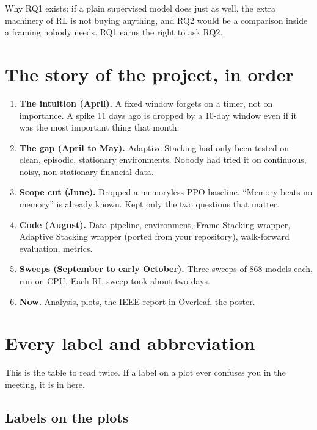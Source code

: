 \documentclass[11pt,a4paper]{article}
\begin{document}
Why RQ1 exists: if a plain supervised model does just as well, the extra machinery of RL is
not buying anything, and RQ2 would be a comparison inside a framing nobody needs. RQ1 earns
the right to ask RQ2.

\section{The story of the project, in order}

\begin{enumerate}
  \item \textbf{The intuition (April).} A fixed window forgets on a timer, not on
        importance. A spike 11 days ago is dropped by a 10-day window even if it was the
        most important thing that month.
  \item \textbf{The gap (April to May).} Adaptive Stacking had only been tested on clean,
        episodic, stationary environments. Nobody had tried it on continuous, noisy,
        non-stationary financial data.
  \item \textbf{Scope cut (June).} Dropped a memoryless PPO baseline. ``Memory beats no
        memory'' is already known. Kept only the two questions that matter.
  \item \textbf{Code (August).} Data pipeline, environment, Frame Stacking wrapper,
        Adaptive Stacking wrapper (ported from your repository), walk-forward evaluation,
        metrics.
  \item \textbf{Sweeps (September to early October).} Three sweeps of 868 models each, run
        on CPU. Each RL sweep took about two days.
  \item \textbf{Now.} Analysis, plots, the IEEE report in Overleaf, the poster.
\end{enumerate}

\section{Every label and abbreviation}

This is the table to read twice. If a label on a plot ever confuses you in the meeting,
it is in here.

\subsection{Labels on the plots}
\end{document}
